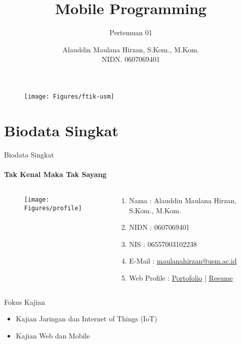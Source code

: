 \documentclass[12pt,hyperref={colorlinks,citecolor=blue,urlcolor=peking_blue,linkcolor=},aspectratio=169]{beamer}
\author[Alauddin Maulana Hirzan]{Alauddin Maulana Hirzan, S.Kom., M.Kom.\\ NIDN. 0607069401}
\title{Mobile Programming}
\subtitle{Pertemuan 01}
\institute{Fakultas Teknologi Informasi dan Komunikasi, Universitas Semarang}
\date{}
\theoremstyle{plain}
\newif\ifplacelogo %
\begin{document}
{
\begin{frame}
    \titlepage
    \begin{figure}[htpb]
        \begin{center}
            \texttt{[image: Figures/ftik-usm]}
        \end{center}
    \end{figure}
\end{frame}
}

\placelogofalse

\section{Biodata Singkat}
\begin{frame}{Biodata Singkat}
	\framesubtitle{Tak Kenal Maka Tak Sayang}
	\begin{columns}
		\begin{column}{.2\textwidth}
			\begin{figure}[htpb]
				\begin{center}
					\texttt{[image: Figures/profile]}
				\end{center}
			\end{figure}
		\end{column}
		\begin{column}{.8\textwidth}
			\begin{enumerate}
				\justifying
				\item Nama : Alauddin Maulana Hirzan, S.Kom., M.Kom.
				\item NIDN : 0607069401
				\item NIS : 06557003102238
				\item E-Mail : \hyperlink{mailto:maulanahirzan@usm.ac.id}{maulanahirzan@usm.ac.id}
				\item Web Profile : \hyperlink{http://maulanahirzan.pythonanywhere.com/}{Portofolio} | \hyperlink{https://ftik.usm.ac.id/profile-alauddin-maulana-hirzan-s-kom-m-kom/}{Resume}
			\end{enumerate}
		\end{column}
	\end{columns}
	\vfill
	\begin{block}{Fokus Kajian}
		\begin{itemize}
			\item Kajian Jaringan dan Internet of Things (IoT)
			\item Kajian Web dan Mobile
		\end{itemize}
	\end{block}
\end{frame}
\end{document}
